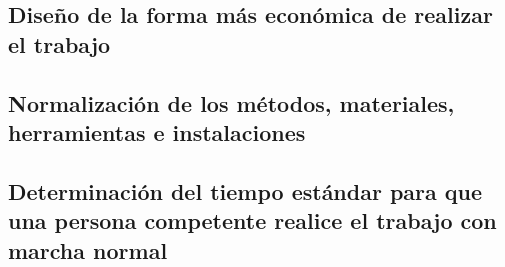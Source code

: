    
    \subsection{Diseño de la forma más económica de realizar el trabajo}
    
    \subsection{Normalización de los métodos, materiales, herramientas e instalaciones}
    
    \subsection{Determinación del tiempo estándar para que una persona competente realice el trabajo con marcha normal}
    
    
    
    
    
